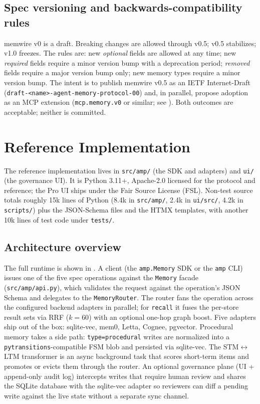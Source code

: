 \documentclass[11pt,letterpaper,twocolumn]{article}
\begin{document}
\subsection{Spec versioning and backwards-compatibility rules}
\label{sec:spec-versioning}

memwire v0 is a draft. Breaking changes are allowed through v0.5; v0.5 stabilizes; v1.0 freezes. The rules are: new \emph{optional} fields are allowed at any time; new \emph{required} fields require a minor version bump with a deprecation period; \emph{removed} fields require a major version bump only; new memory types require a minor version bump. The intent is to publish memwire v0.5 as an IETF Internet-Draft (\texttt{draft-<name>-agent-memory-protocol-00}) and, in parallel, propose adoption as an MCP extension (\texttt{mcp.memory.v0} or similar; see ). Both outcomes are acceptable; neither is committed.

\section{Reference Implementation}
\label{sec:impl}

The reference implementation lives in \texttt{src/amp/} (the SDK and adapters) and \texttt{ui/} (the governance UI). It is Python 3.11+, Apache-2.0 licensed for the protocol and reference; the Pro UI ships under the Fair Source License (FSL). Non-test source totals roughly 15k lines of Python (8.4k in \texttt{src/amp/}, 2.4k in \texttt{ui/src/}, 4.2k in \texttt{scripts/}) plus the JSON-Schema files and the HTMX templates, with another 10k lines of test code under \texttt{tests/}.

\subsection{Architecture overview}
\label{sec:impl-arch}

The full runtime is shown in . A client (the \texttt{amp.Memory} SDK or the \texttt{amp} CLI) issues one of the five spec operations against the \texttt{Memory} facade (\texttt{src/amp/api.py}), which validates the request against the operation's JSON Schema and delegates to the \texttt{MemoryRouter}. The router fans the operation across the configured backend adapters in parallel; for \texttt{recall} it fuses the per-store result sets via RRF ($k=60$) with an optional one-hop graph boost. Five adapters ship out of the box: sqlite-vec, mem0, Letta, Cognee, pgvector. Procedural memory takes a side path: \texttt{type=procedural} writes are normalized into a \texttt{pytransitions}-compatible FSM blob and persisted via sqlite-vec. The STM$\leftrightarrow$LTM transformer is an async background task that scores short-term items and promotes or evicts them through the router. An optional governance plane (UI + append-only audit log) intercepts writes that require human review and shares the SQLite database with the sqlite-vec adapter so reviewers can diff a pending write against the live state without a separate sync channel.
\end{document}
